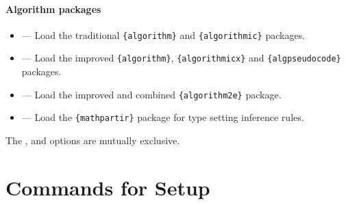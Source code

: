 \paragraph{Algorithm packages}\label{par:algo-options}
\begin{itemize}[noitemsep]
\item {} --- Load the traditional \verb|{algorithm}| and \verb|{algorithmic}| packages.
\item {} --- Load the improved \verb|{algorithm}|, \verb|{algorithmicx}| and \verb|{algpseudocode}| packages.
\item {} --- Load the improved and combined \verb|{algorithm2e}| package.
\item {} --- Load the \verb|{mathpartir}| package for type setting inference rules.
\end{itemize}
The ,  and  options are mutually exclusive.

\section{Commands for Setup}


